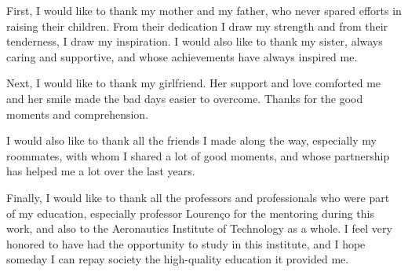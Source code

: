 First, I would like to thank my mother and my father, who never spared efforts in raising their children. From their dedication I draw my strength and from their tenderness, I draw my inspiration. I would also like to thank my sister, always caring and supportive, and whose achievements have always inspired me.

Next, I would like to thank my girlfriend. Her support and love comforted me and her smile made the bad days easier to overcome. Thanks for the good moments and comprehension.

I would also like to thank all the friends I made along the way, especially my roommates, with whom I shared a lot of good moments, and whose partnership has helped me a lot over the last years.

Finally, I would like to thank all the professors and professionals who were part of my education, especially professor Lourenço for the mentoring during this work, and also to the Aeronautics Institute of Technology as a whole. I feel very honored to have had the opportunity to study in this institute, and I hope someday I can repay society the high-quality education it provided me.

